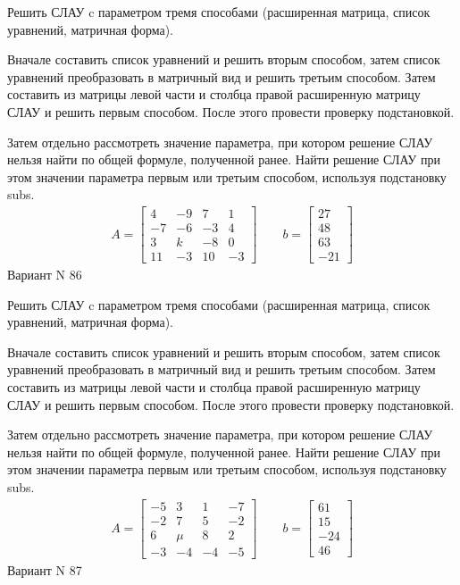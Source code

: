\documentclass[11pt]{report}
\begin{document}
Решить СЛАУ c параметром тремя способами (расширенная матрица, список уравнений, матричная форма).

Вначале составить список уравнений и решить вторым способом,
затем список уравнений преобразовать в матричный вид и решить третьим способом.
Затем составить из матрицы левой части и столбца правой расширенную матрицу СЛАУ и решить первым способом.
После этого провести проверку подстановкой.

Затем отдельно рассмотреть значение параметра, при котором решение СЛАУ нельзя найти по общей формуле,
полученной ранее.
Найти решение СЛАУ при этом значении параметра первым или третьим способом, используя подстановку subs.
\begin{align*}
    A = \left[\begin{matrix}4 & -9 & 7 & 1\\-7 & -6 & -3 & 4\\3 & k & -8 & 0\\11 & -3 & 10 & -3\end{matrix}\right]
\qquad b = \left[\begin{matrix}27\\48\\63\\-21\end{matrix}\right]
\end{align*}
\newpage
Вариант N 86


Решить СЛАУ c параметром тремя способами (расширенная матрица, список уравнений, матричная форма).

Вначале составить список уравнений и решить вторым способом,
затем список уравнений преобразовать в матричный вид и решить третьим способом.
Затем составить из матрицы левой части и столбца правой расширенную матрицу СЛАУ и решить первым способом.
После этого провести проверку подстановкой.

Затем отдельно рассмотреть значение параметра, при котором решение СЛАУ нельзя найти по общей формуле,
полученной ранее.
Найти решение СЛАУ при этом значении параметра первым или третьим способом, используя подстановку subs.
\begin{align*}
    A = \left[\begin{matrix}-5 & 3 & 1 & -7\\-2 & 7 & 5 & -2\\6 & \mu & 8 & 2\\-3 & -4 & -4 & -5\end{matrix}\right]
\qquad b = \left[\begin{matrix}61\\15\\-24\\46\end{matrix}\right]
\end{align*}
\newpage
Вариант N 87
\end{document}
